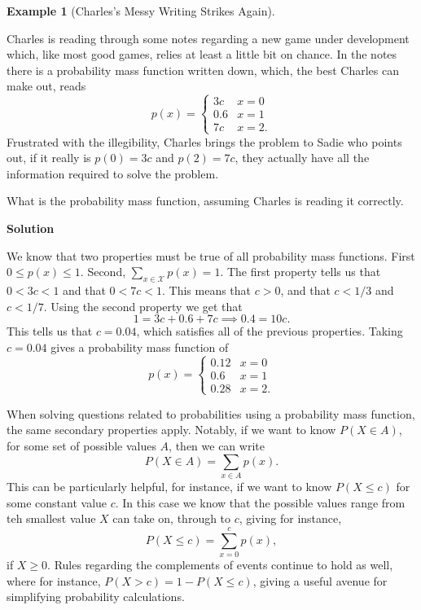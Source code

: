 \documentclass[
  letterpaper,
  DIV=11,
  numbers=noendperiod]{scrreprt}
\theoremstyle{definition}
\theoremstyle{definition}
\theoremstyle{definition}
\newtheorem{example}{Example}[chapter]
\theoremstyle{remark}
\begin{document}
\begin{example}[Charles's Messy Writing Strikes
Again]\protect\hypertarget{exm-finding-a-pmf}{}\label{exm-finding-a-pmf}

Charles is reading through some notes regarding a new game under
development which, like most good games, relies at least a little bit on
chance. In the notes there is a probability mass function written down,
which, the best Charles can make out, reads
\[p(x) = \begin{cases} 3c & x = 0 \\ 0.6 & x = 1 \\ 7c & x = 2.\end{cases}\]
Frustrated with the illegibility, Charles brings the problem to Sadie
who points out, if it really is \(p(0) = 3c\) and \(p(2) = 7c\), they
actually have all the information required to solve the problem.

What is the probability mass function, assuming Charles is reading it
correctly.

\begin{tcolorbox}[enhanced jigsaw, colback=white, breakable, rightrule=.15mm, leftrule=.75mm, toprule=.15mm, left=2mm, arc=.35mm, opacityback=0, bottomrule=.15mm]

\vspace{-3mm}\textbf{Solution}\vspace{3mm}

We know that two properties must be true of all probability mass
functions. First \(0 \leq p(x) \leq 1\). Second,
\(\sum_{x\in\mathcal{X}} p(x) = 1\). The first property tells us that
\(0 < 3c < 1\) and that \(0 < 7c < 1\). This means that \(c > 0\), and
that \(c < 1/3\) and \(c < 1/7\). Using the second property we get that
\[1 = 3c + 0.6 + 7c \implies 0.4 = 10c.\] This tells us that
\(c = 0.04\), which satisfies all of the previous properties. Taking
\(c = 0.04\) gives a probability mass function of
\[p(x) = \begin{cases} 0.12 & x = 0 \\ 0.6 & x = 1 \\ 0.28 & x = 2.\end{cases}\]

\end{tcolorbox}

\end{example}

When solving questions related to probabilities using a probability mass
function, the same secondary properties apply. Notably, if we want to
know \(P(X\in A)\), for some set of possible values \(A\), then we can
write \[P(X\in A) = \sum_{x\in A}p(x).\] This can be particularly
helpful, for instance, if we want to know \(P(X \leq c)\) for some
constant value \(c\). In this case we know that the possible values
range from teh smallest value \(X\) can take on, through to \(c\),
giving for instance, \[P(X\leq c) = \sum_{x=0}^c p(x),\] if
\(X \geq 0\). Rules regarding the complements of events continue to hold
as well, where for instance, \(P(X > c) = 1 - P(X\leq c)\), giving a
useful avenue for simplifying probability calculations.
\end{document}
